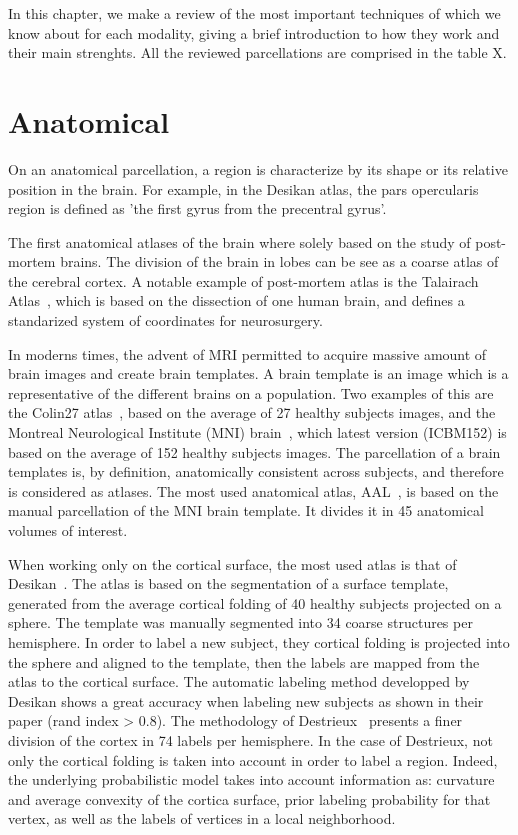 In this chapter, we make a
review of the most important techniques of which we know about for each modality,
giving a brief introduction to how they work and their main strenghts. All the
reviewed parcellations are comprised in the table X. 




\section{Anatomical}
On an anatomical parcellation, a region is characterize by its shape or its
relative position in the brain. For example, in the Desikan atlas, the
pars opercularis region is defined as 'the first gyrus from the precentral gyrus'.

The first anatomical atlases of the brain where solely based on the study of
post-mortem brains. The division of the brain in lobes can be see as a coarse
atlas of the cerebral cortex. A notable example of post-mortem atlas is the 
Talairach Atlas~\cite{Talairach1988}, which is based on the dissection of one
human brain, and defines a standarized system of coordinates for neurosurgery.

In moderns times, the advent of MRI permitted to acquire massive amount
of brain images and create brain templates. A brain template is an image
which is a representative of the different brains on a population. Two
examples of this are the Colin27 atlas~\cite{Collins1998}, based on the average
of 27 healthy subjects images, and the Montreal Neurological Institute (MNI) brain~\cite{Holmes1998},
which latest version (ICBM152) is based on the average of 152 healthy subjects images.
The parcellation of a brain templates is, by definition, anatomically
consistent across subjects, and therefore is considered as atlases. The
most used anatomical atlas, AAL~\cite{Landeau2002}, is based on the manual
parcellation of the MNI brain template. It divides it in 45 anatomical
volumes of interest.

When working only on the cortical surface, the most used atlas is that of
Desikan~\cite{Desikan2006}. The atlas is based on the segmentation of a surface
template, generated from the average cortical folding of 40 healthy subjects
projected on a sphere. The template was manually segmented into 34 coarse 
structures per hemisphere. In order to label a new subject, they cortical 
folding is projected into the sphere and aligned to the template, then 
the labels are mapped from the atlas to the cortical surface. The automatic
labeling method developped by Desikan shows a great accuracy when labeling
new subjects as shown in their paper (rand index > 0.8). The methodology
of Destrieux~\cite{Destrieux2010} presents a finer division of the cortex in
74 labels per hemisphere. In the case of Destrieux, not only the cortical
folding is taken into account in order to label a region. Indeed, the
underlying probabilistic model takes into account information as: curvature
and average convexity of the cortica surface, prior labeling probability for
that vertex, as well as the labels of vertices in a local neighborhood.

